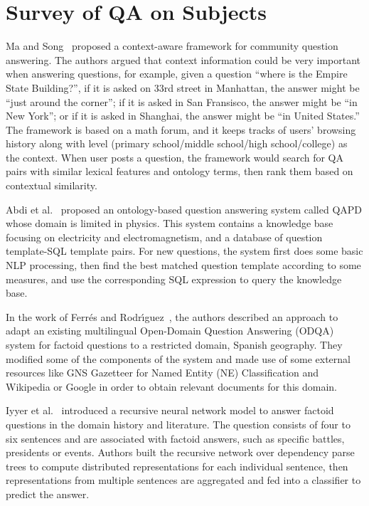 \section{Survey of QA on Subjects}



Ma and Song~ proposed a context-aware framework for community question answering. The authors argued that context information could be very important when answering questions, for example, given a question ``where is the Empire State Building?'', if it is asked on 33rd street in Manhattan, the answer might be ``just around the corner''; if it is asked in San Fransisco, the answer might be ``in New York''; or if it is asked in Shanghai, the answer might be ``in United States.'' The framework is based on a math forum, and it keeps tracks of users' browsing history along with level (primary school/middle school/high school/college) as the context. When user posts a question, the framework would search for QA pairs with similar lexical features and ontology terms, then rank them based on contextual similarity.

Abdi et al.~ proposed an ontology-based question answering system called QAPD whose domain is limited in physics. This system contains a knowledge base focusing on electricity and electromagnetism, and a database of question template-SQL template pairs. For new questions, the system first does some basic NLP processing, then find the best matched question template according to some measures, and use the corresponding SQL expression to query the knowledge base.

In the work of Ferr{\'e}s and Rodr{\'\i}guez~, the authors described an approach to adapt an existing multilingual Open-Domain Question Answering (ODQA) system for factoid questions to a restricted domain, Spanish geography. They modified some of the components of the system and made use of some external resources like GNS Gazetteer for Named Entity (NE) Classification and Wikipedia or Google in order to obtain relevant documents for this domain.

Iyyer et al.~ introduced a recursive neural network model to answer factoid questions in the domain history and literature. The question consists of four to six sentences and are associated with factoid answers, such as specific battles, presidents or events. Authors built the recursive network over dependency parse trees to compute distributed representations for each individual sentence, then representations from multiple sentences are aggregated and fed into a classifier to predict the answer.

